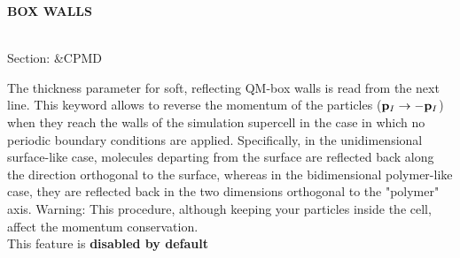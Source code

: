 \documentclass[twoside,10pt,titlepage,a4paper]{article}
\newcommand{\reflabel}[1]{\hypertarget{#1}}
\newcommand{\reflabel}[1]{\label{#1}}
\newcommand{\keyword}[5]{%
\vspace{1.0cm}
\begin{minipage}{15cm}
\reflabel{#1}{\textbf{\large #1}}%
\index{#1}%
\ \textbf{#2}%
\ \textbf{#3}%
\ \textit{#4}%
     \hfill\\\smallskip
     {Section: #5}
     \hfill\\\smallskip\vskip 10pt
\end{minipage}
}%
\newcommand{\desc}[1]{%
   \hspace*{\fill} \parbox{130mm}{\sloppy
                          {#1}%
                             }
     \hfill\\\smallskip
   }%
\newcommand{\desc}[1]{#1\vspace{1ex}}
\begin{document}
\keyword{BOX WALLS}{}{}{}{\&CPMD}
  \desc{The thickness parameter for soft, reflecting QM-box walls
    is read from the next line. This keyword allows to reverse the
    momentum of the particles (${\bf p}_I \rightarrow -{\bf p}_I$)
    when they reach the walls of the simulation supercell in the
    case in which no periodic boundary conditions are applied.
    Specifically, in the unidimensional surface-like case, molecules
    departing from the surface are reflected back along the direction
    orthogonal to the surface, whereas in the bidimensional polymer-like
    case, they are reflected back in the two dimensions orthogonal to
    the "polymer" axis. Warning: This procedure, although keeping your
    particles inside the cell, affect the momentum conservation. \\
    This feature is {\bf disabled by default}}
\end{document}
